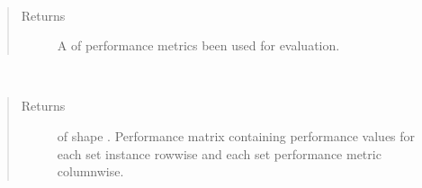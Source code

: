 \documentclass[letterpaper,10pt,english]{sphinxmanual}
\begin{document}
\begin{fulllineitems}
\begin{fulllineitems}
\begin{quote}
\begin{description}
\end{description}\end{quote}

\end{fulllineitems}


\begin{fulllineitems}
\label{\detokenize{pusion.evaluation.evaluation:pusion.evaluation.evaluation.Evaluation.get_metrics}}~\begin{quote}\begin{description}
\item[{Returns}] \leavevmode
\sphinxAtStartPar
A  of performance metrics been used for evaluation.

\end{description}\end{quote}

\end{fulllineitems}


\begin{fulllineitems}
\label{\detokenize{pusion.evaluation.evaluation:pusion.evaluation.evaluation.Evaluation.get_performance_matrix}}~\begin{quote}\begin{description}
\item[{Returns}] \leavevmode
\sphinxAtStartPar
{} of shape . Performance matrix containing performance values
for each set instance row\sphinxhyphen{}wise and each set performance metric column\sphinxhyphen{}wise.

\end{description}\end{quote}

\end{fulllineitems}



\end{fulllineitems}
\end{document}
